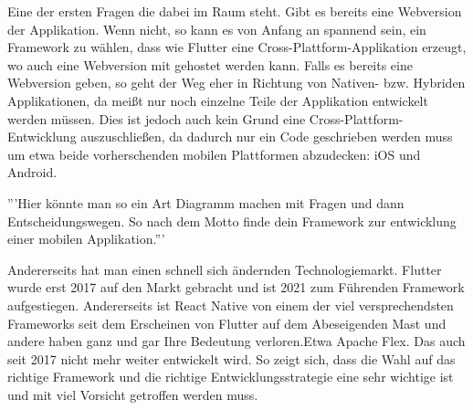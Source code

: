Eine der ersten Fragen die dabei im Raum steht. 
Gibt es bereits eine Webversion der Applikation.
Wenn nicht, so kann es von Anfang an spannend sein, ein Framework zu wählen, dass wie Flutter eine Cross-Plattform-Applikation erzeugt, wo auch eine Webversion mit gehostet werden kann.
Falls es bereits eine Webversion geben, so geht der Weg eher in Richtung von Nativen- bzw. Hybriden Applikationen, da meißt nur noch einzelne Teile der Applikation entwickelt werden müssen. Dies ist jedoch auch kein Grund eine Cross-Plattform-Entwicklung auszuschließen, da dadurch nur ein Code geschrieben werden muss um etwa beide vorherschenden mobilen Plattformen abzudecken: iOS und Android.

'''Hier könnte man so ein Art Diagramm machen mit Fragen und dann Entscheidungswegen. So nach dem Motto finde dein Framework zur entwicklung einer mobilen Applikation.'''


Andererseits hat man einen schnell sich ändernden Technologiemarkt. Flutter wurde erst 2017 auf den Markt gebracht und ist 2021 zum Führenden Framework aufgestiegen. Andererseits ist React Native von einem der viel versprechendsten Frameworks seit dem Erscheinen von Flutter auf dem Abeseigenden Mast und andere haben ganz und gar Ihre Bedeutung verloren.Etwa Apache Flex. Das auch seit 2017 nicht mehr weiter entwickelt wird. So zeigt sich, dass die Wahl auf das richtige Framework und die richtige Entwicklungsstrategie eine sehr wichtige ist und mit viel Vorsicht getroffen werden muss.